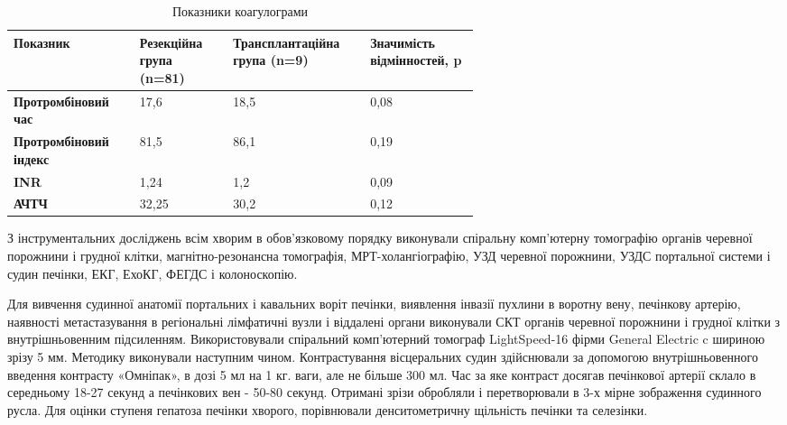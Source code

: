\begin{table}[]
\centering
\caption{Показники коагулограми }
\label{tab:KG}
\begin{tabular}{|p{0.15\linewidth}|
                 p{0.15\linewidth}|
                 p{0.15\linewidth}|
                 p{0.15\linewidth}|}
\hline
{\color[HTML]{231F20} \textbf{Показник}} &
  {\color[HTML]{231F20} \textbf{Резекційна група (n=81)}} &
  {\color[HTML]{231F20} \textbf{Транс\-план\-тацій\-на група (n=9)}} &
  {\color[HTML]{231F20} \textbf{Значимість відмінностей, p}} \\ \hline
{\color[HTML]{231F20} \textbf{Про\-тромб\-іновий час}}    & {\color[HTML]{231F20} 17,6}  & {\color[HTML]{231F20} 18,5} & 0,08 \\ \hline
{\color[HTML]{231F20} \textbf{Про\-тромб\-іновий індекс}} & {\color[HTML]{231F20} 81,5}  & {\color[HTML]{231F20} 86,1} & 0,19 \\ \hline
{\color[HTML]{231F20} \textbf{INR}}                   & {\color[HTML]{231F20} 1,24}  & {\color[HTML]{231F20} 1,2}  & 0,09 \\ \hline
{\color[HTML]{231F20} \textbf{АЧТЧ}}                  & {\color[HTML]{231F20} 32,25} & {\color[HTML]{231F20} 30,2} & 0,12 \\ \hline
\end{tabular}
\end{table}




З інструментальних досліджень всім хворим в обов'язковому порядку виконували спіральну комп'ютерну томографію органів черевної порожнини і грудної клітки, магнітно-резонансна томографія, МРТ-холангіографію, УЗД черевної порожнини, УЗДС портальної системи і судин печінки, ЕКГ, ЕхоКГ, ФЕГДС і колоноскопію. 

Для вивчення судинної анатомії портальних і кавальних воріт печінки, виявлення інвазії пухлини в воротну вену, печінкову артерію, наявності метастазування в регіональні лімфатичні вузли і віддалені органи виконували СКТ органів черевної порожнини і грудної клітки з внутрішньовенним підсиленням. Використовували спіральний комп'ютерний томограф LightSpeed-16 фірми General Electric c шириною зрізу 5 мм. Методику виконували наступним чином. Контрастування вісцеральних судин здійснювали за допомогою внутрішньовенного введення контрасту «Омніпак», в дозі 5 мл на 1 кг. ваги, але не більше 300 мл. Час за яке контраст досягав печінкової артерії склало в середньому 18-27 секунд а печінкових вен - 50-80 секунд. Отримані зрізи обробляли і перетворювали в 3-х мірне зображення судинного русла. Для оцінки ступеня гепатоза печінки хворого, порівнювали денситометричну щільність печінки та селезінки.

